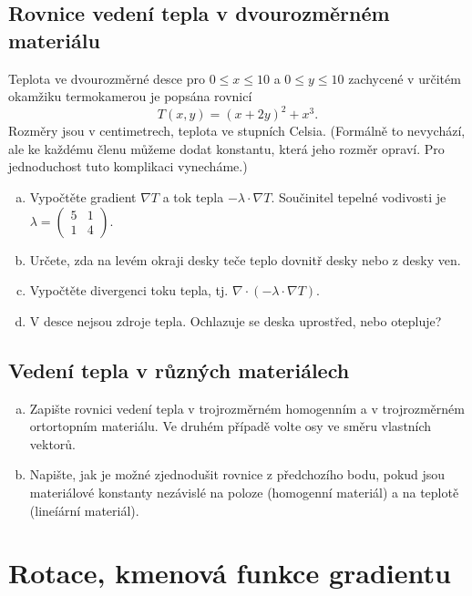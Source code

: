 
\subsection{Rovnice vedení tepla v dvourozměrném materiálu}

Teplota ve dvourozměrné desce pro $0\leq x\leq 10$ a $0\leq y\leq 10$ zachycené v určitém okamžiku termokamerou je popsána rovnicí
  $$T(x,y)=(x+2y)^2+x^3.$$
  Rozměry jsou v centimetrech, teplota ve stupních Celsia. (Formálně to nevychází, ale ke každému členu můžeme dodat konstantu, která jeho rozměr opraví. Pro jednoduchost tuto komplikaci vynecháme.)

\begin{enumerate}[a)]
\item Vypočtěte gradient $\nabla T$  a tok tepla $-\lambda \cdot \nabla T.$
Součinitel tepelné vodivosti je $\lambda=
  \begin{pmatrix}
    5 & 1\\1&4
  \end{pmatrix}.
$ 
\item Určete, zda na levém okraji desky teče teplo dovnitř desky nebo z desky ven.
\item Vypočtěte divergenci toku tepla, tj. $\nabla\cdot(-\lambda \cdot \nabla T).$
\item V desce nejsou zdroje tepla. Ochlazuje se deska uprostřed, nebo otepluje?
\end{enumerate}


\subsection{Vedení tepla v různých materiálech}

\begin{enumerate}[a)]
\item Zapište rovnici vedení tepla v trojrozměrném homogenním a v
  trojrozměrném ortortopním materiálu. Ve druhém případě volte osy ve
  směru vlastních vektorů.
\item Napište, jak je možné zjednodušit rovnice z předchozího bodu,
  pokud jsou materiálové konstanty nezávislé na poloze (homogenní
  materiál) a na teplotě (lineíární materiál).
\end{enumerate}

\section{Rotace, kmenová funkce gradientu}

